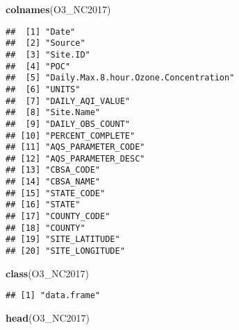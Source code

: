 \documentclass[]{article}
\newenvironment{Shaded}{\begin{snugshade}}{\end{snugshade}}
\newcommand{\KeywordTok}[1]{\textcolor[rgb]{0.13,0.29,0.53}{\textbf{#1}}}
\newcommand{\NormalTok}[1]{#1}
\begin{document}
\begin{Shaded}
\begin{Highlighting}[]
\KeywordTok{colnames}\NormalTok{(O3_NC2017)}
\end{Highlighting}
\end{Shaded}

\begin{verbatim}
##  [1] "Date"                                
##  [2] "Source"                              
##  [3] "Site.ID"                             
##  [4] "POC"                                 
##  [5] "Daily.Max.8.hour.Ozone.Concentration"
##  [6] "UNITS"                               
##  [7] "DAILY_AQI_VALUE"                     
##  [8] "Site.Name"                           
##  [9] "DAILY_OBS_COUNT"                     
## [10] "PERCENT_COMPLETE"                    
## [11] "AQS_PARAMETER_CODE"                  
## [12] "AQS_PARAMETER_DESC"                  
## [13] "CBSA_CODE"                           
## [14] "CBSA_NAME"                           
## [15] "STATE_CODE"                          
## [16] "STATE"                               
## [17] "COUNTY_CODE"                         
## [18] "COUNTY"                              
## [19] "SITE_LATITUDE"                       
## [20] "SITE_LONGITUDE"
\end{verbatim}

\begin{Shaded}
\begin{Highlighting}[]
\KeywordTok{class}\NormalTok{(O3_NC2017)}
\end{Highlighting}
\end{Shaded}

\begin{verbatim}
## [1] "data.frame"
\end{verbatim}

\begin{Shaded}
\begin{Highlighting}[]
\KeywordTok{head}\NormalTok{(O3_NC2017)}
\end{Highlighting}
\end{Shaded}
\end{document}
